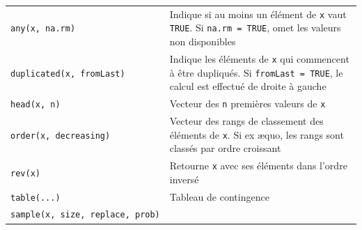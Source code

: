 \documentclass[
  11pt,
]{book}
\numberwithin{equation}{section}
\numberwithin{countremarque}{section}
\begin{document}
\begin{longtable}[]{@{}ll@{}}
\begin{minipage}[t]{0.41\columnwidth}
\texttt{any(x,\ na.rm)}\strut
\end{minipage} & \begin{minipage}[t]{0.53\columnwidth}\raggedright
Indique si au moins un élément de \texttt{x} vaut \texttt{TRUE}. Si \texttt{na.rm\ =\ TRUE}, omet les valeurs non disponibles\strut
\end{minipage}\tabularnewline
\begin{minipage}[t]{0.41\columnwidth}\raggedright
\texttt{duplicated(x,\ fromLast)}\strut
\end{minipage} & \begin{minipage}[t]{0.53\columnwidth}\raggedright
Indique les éléments de \texttt{x} qui commencent à être dupliqués. Si \texttt{fromLast\ =\ TRUE}, le calcul est effectué de droite à gauche\strut
\end{minipage}\tabularnewline
\begin{minipage}[t]{0.41\columnwidth}\raggedright
\texttt{head(x,\ n)}\strut
\end{minipage} & \begin{minipage}[t]{0.53\columnwidth}\raggedright
Vecteur des \texttt{n} premières valeurs de \texttt{x}\strut
\end{minipage}\tabularnewline
\begin{minipage}[t]{0.41\columnwidth}\raggedright
\texttt{order(x,\ decreasing)}\strut
\end{minipage} & \begin{minipage}[t]{0.53\columnwidth}\raggedright
Vecteur des rangs de classement des éléments de \texttt{x}. Si ex æquo, les rangs sont classés par ordre croissant\strut
\end{minipage}\tabularnewline
\begin{minipage}[t]{0.41\columnwidth}\raggedright
\texttt{rev(x)}\strut
\end{minipage} & \begin{minipage}[t]{0.53\columnwidth}\raggedright
Retourne \texttt{x} avec ses éléments dans l'ordre inversé\strut
\end{minipage}\tabularnewline
\begin{minipage}[t]{0.41\columnwidth}\raggedright
\texttt{table(...)}\strut
\end{minipage} & \begin{minipage}[t]{0.53\columnwidth}\raggedright
Tableau de contingence\strut
\end{minipage}\tabularnewline
\begin{minipage}[t]{0.41\columnwidth}\raggedright
\texttt{sample(x,\ size,\ replace,\ prob)}\strut

\end{minipage}
\end{longtable}
\end{document}

